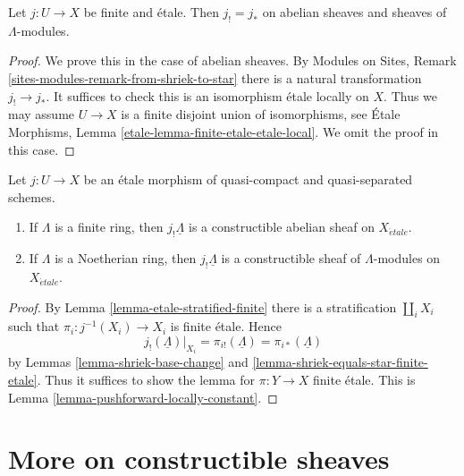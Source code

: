 \begin{lemma}
\label{lemma-shriek-equals-star-finite-etale}
Let $j : U \to X$ be finite and \'etale. Then $j_! = j_*$
on abelian sheaves and sheaves of $\Lambda$-modules.
\end{lemma}

\begin{proof}
We prove this in the case of abelian sheaves.
By Modules on Sites, Remark \ref{sites-modules-remark-from-shriek-to-star}
there is a natural transformation $j_! \to j_*$.
It suffices to check this is an isomorphism \'etale locally
on $X$. Thus we may assume $U \to X$ is a finite disjoint union
of isomorphisms, see
\'Etale Morphisms, Lemma \ref{etale-lemma-finite-etale-etale-local}.
We omit the proof in this case.
\end{proof}

\begin{lemma}
\label{lemma-jshriek-constructible}
Let $j : U \to X$ be an \'etale morphism of quasi-compact and
quasi-separated schemes.
\begin{enumerate}
\item If $\Lambda$ is a finite ring, then $j_!\underline{\Lambda}$ is a
constructible abelian sheaf on $X_{\acute{e}tale}$.
\item If $\Lambda$ is a Noetherian ring, then $j_!\underline{\Lambda}$ is a
constructible sheaf of $\Lambda$-modules on $X_{\acute{e}tale}$.
\end{enumerate}
\end{lemma}

\begin{proof}
By Lemma \ref{lemma-etale-stratified-finite} there is a stratification
$\coprod_i X_i$ such that $\pi_i: j^{-1}(X_i) \to X_i$ is finite \'etale.
Hence
$$
j_!(\underline{\Lambda})|_{X_i} =
\pi_{i!}(\underline{\Lambda}) =
\pi_{i*}(\underline{\Lambda})
$$
by Lemmas \ref{lemma-shriek-base-change} and
\ref{lemma-shriek-equals-star-finite-etale}.
Thus it suffices to show the lemma for $\pi : Y \to X$ finite \'etale.
This is Lemma \ref{lemma-pushforward-locally-constant}.
\end{proof}








\section{More on constructible sheaves}
\label{section-more-constructible}

